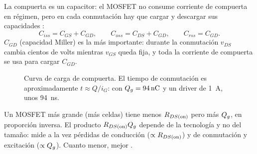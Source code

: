 La compuerta es un capacitor: el MOSFET no consume corriente de compuerta en régimen, pero en cada
conmutación hay que cargar y descargar sus capacidades :
\[
  C_{iss}=C_{GS}+C_{GD},\qquad C_{oss}=C_{DS}+C_{GD},\qquad C_{rss}=C_{GD}.
\]
$C_{GD}$ (capacidad Miller) es la más importante: durante la conmutación $v_{DS}$ cambia cientos de
volts mientras $v_{GS}$ queda fija, y toda la corriente de compuerta se usa para cargar $C_{GD}$.

\begin{figure}[H]
\centering
{}
\caption{Curva de carga de compuerta. El tiempo de conmutación es aproximadamente
$t\approx Q/i_G$: con $Q_{g}=\SI{94}{nC}$ y un driver de \SI{1}{A}, unos \SI{94}{ns}.}
\label{fig:carga-compuerta}
\end{figure}

\begin{definicion}
Un MOSFET más grande (más celdas) tiene menos $R_{DS(\mathrm{on})}$ pero más $Q_{g}$, en proporción inversa. El
producto $R_{DS(\mathrm{on})}Q_{g}$ depende de la tecnología y no del tamaño: mide a la vez pérdidas de conducción
($\propto R_{DS(\mathrm{on})}$) y de conmutación y excitación ($\propto Q_{g}$). Cuanto menor, mejor .
\end{definicion}
